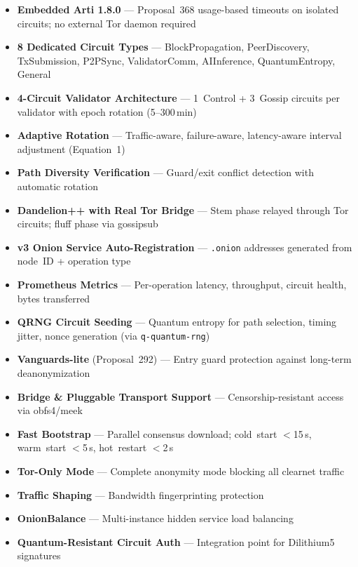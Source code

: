 \documentclass[11pt,a4paper]{article}
\begin{document}
\begin{itemize}[leftmargin=*]
    \item[$\checkmark$] \textbf{Embedded Arti 1.8.0} --- Proposal~368 usage-based timeouts on isolated circuits; no external Tor daemon required
    \item[$\checkmark$] \textbf{8 Dedicated Circuit Types} --- BlockPropagation, PeerDiscovery, TxSubmission, P2PSync, ValidatorComm, AIInference, QuantumEntropy, General
    \item[$\checkmark$] \textbf{4-Circuit Validator Architecture} --- 1~Control + 3~Gossip circuits per validator with epoch rotation (5--300\,min)
    \item[$\checkmark$] \textbf{Adaptive Rotation} --- Traffic-aware, failure-aware, latency-aware interval adjustment (Equation~1)
    \item[$\checkmark$] \textbf{Path Diversity Verification} --- Guard/exit conflict detection with automatic rotation
    \item[$\checkmark$] \textbf{Dandelion++ with Real Tor Bridge} --- Stem phase relayed through Tor circuits; fluff phase via gossipsub
    \item[$\checkmark$] \textbf{v3 Onion Service Auto-Registration} --- \texttt{.onion} addresses generated from node~ID + operation type
    \item[$\checkmark$] \textbf{Prometheus Metrics} --- Per-operation latency, throughput, circuit health, bytes transferred
    \item[$\checkmark$] \textbf{QRNG Circuit Seeding} --- Quantum entropy for path selection, timing jitter, nonce generation (via \texttt{q-quantum-rng})
    \item[$\checkmark$] \textbf{Vanguards-lite} (Proposal~292) --- Entry guard protection against long-term deanonymization
    \item[$\checkmark$] \textbf{Bridge \& Pluggable Transport Support} --- Censorship-resistant access via obfs4/meek
    \item[$\checkmark$] \textbf{Fast Bootstrap} --- Parallel consensus download; cold~start $<$15\,s, warm~start $<$5\,s, hot~restart $<$2\,s
    \item[$\checkmark$] \textbf{Tor-Only Mode} --- Complete anonymity mode blocking all clearnet traffic
    \item[$\checkmark$] \textbf{Traffic Shaping} --- Bandwidth fingerprinting protection
    \item[$\checkmark$] \textbf{OnionBalance} --- Multi-instance hidden service load balancing
    \item[$\checkmark$] \textbf{Quantum-Resistant Circuit Auth} --- Integration point for Dilithium5 signatures
\end{itemize}
\end{document}
